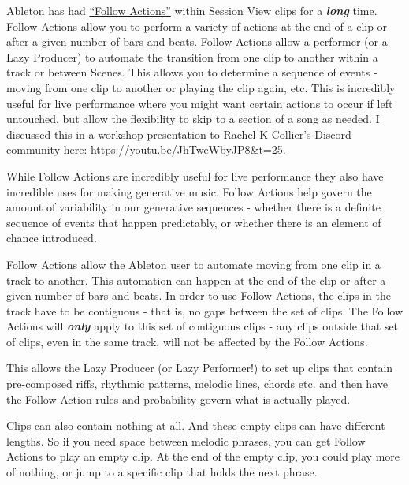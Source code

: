 \documentclass[
  12pt,
  letterpaper,
  oneside,
  open=any]{scrbook}
\begin{document}
Ableton has had
\href{https://www.ableton.com/en/live-manual/11/launching-clips/\#follow-actions}{``Follow
Actions''} within Session View clips for a \textbf{\emph{long}} time.
Follow Actions allow you to perform a variety of actions at the end of a
clip or after a given number of bars and beats. Follow Actions allow a
performer (or a Lazy Producer) to automate the transition from one clip
to another within a track or between Scenes. This allows you to
determine a sequence of events - moving from one clip to another or
playing the clip again, etc. This is incredibly useful for live
performance where you might want certain actions to occur if left
untouched, but allow the flexibility to skip to a section of a song as
needed. I discussed this in a workshop presentation to Rachel K
Collier's Discord community here: https://youtu.be/JhTweWbyJP8\&t=25.

While Follow Actions are incredibly useful for live performance they
also have incredible uses for making generative music. Follow Actions
help govern the amount of variability in our generative sequences -
whether there is a definite sequence of events that happen predictably,
or whether there is an element of chance introduced.

\begin{tcolorbox}[enhanced jigsaw, breakable, left=2mm, leftrule=.75mm, toprule=.15mm, opacitybacktitle=0.6, toptitle=1mm, coltitle=black, colback=white, colbacktitle=quarto-callout-tip-color!10!white, opacityback=0, rightrule=.15mm, bottomrule=.15mm, titlerule=0mm, title=\textcolor{quarto-callout-tip-color}{\faLightbulb}\hspace{0.5em}{Key idea}, arc=.35mm, bottomtitle=1mm, colframe=quarto-callout-tip-color-frame]

Follow Actions allow the Ableton user to automate moving from one clip
in a track to another. This automation can happen at the end of the clip
or after a given number of bars and beats. In order to use Follow
Actions, the clips in the track have to be contiguous - that is, no gaps
between the set of clips. The Follow Actions will \textbf{\emph{only}}
apply to this set of contiguous clips - any clips outside that set of
clips, even in the same track, will not be affected by the Follow
Actions.

This allows the Lazy Producer (or Lazy Performer!) to set up clips that
contain pre-composed riffs, rhythmic patterns, melodic lines, chords
etc. and then have the Follow Action rules and probability govern what
is actually played.

Clips can also contain nothing at all. And these empty clips can have
different lengths. So if you need space between melodic phrases, you can
get Follow Actions to play an empty clip. At the end of the empty clip,
you could play more of nothing, or jump to a specific clip that holds
the next phrase.

\end{tcolorbox}
\end{document}
